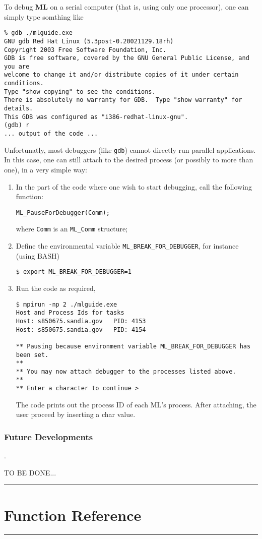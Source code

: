 \documentclass[10pt,letter,relax]{SANDreport}
\newcommand{\HRule}{\noindent\rule{\linewidth}{1mm}}
\newcommand{\ML}     {{\bf ML }}
\begin{document}
To debug \ML on a serial computer (that is, using only one processor),
one can simply type somthing like
\begin{verbatim}
% gdb ./mlguide.exe
GNU gdb Red Hat Linux (5.3post-0.20021129.18rh)
Copyright 2003 Free Software Foundation, Inc.
GDB is free software, covered by the GNU General Public License, and you are
welcome to change it and/or distribute copies of it under certain conditions.
Type "show copying" to see the conditions.
There is absolutely no warranty for GDB.  Type "show warranty" for details.
This GDB was configured as "i386-redhat-linux-gnu".
(gdb) r
... output of the code ...
\end{verbatim}
Unfortunatly, most debuggers (like \verb!gdb!) cannot directly run
parallel applications. In this case, one can still attach to the desired
process (or possibly to more than one), in a very simple way:
\begin{enumerate}
\item In the part of the code where one wish to start debugging, call
  the following function:
\begin{verbatim}
ML_PauseForDebugger(Comm);
\end{verbatim}
where \verb!Comm! is an \verb!ML_Comm! structure;
\item Define the environmental variable \verb!ML_BREAK_FOR_DEBUGGER!,
  for instance (using BASH)
\begin{verbatim}
$ export ML_BREAK_FOR_DEBUGGER=1
\end{verbatim}
\item Run the code as required,
\begin{verbatim}
$ mpirun -np 2 ./mlguide.exe
Host and Process Ids for tasks
Host: s850675.sandia.gov   PID: 4153
Host: s850675.sandia.gov   PID: 4154

** Pausing because environment variable ML_BREAK_FOR_DEBUGGER has been set.
**
** You may now attach debugger to the processes listed above.
**
** Enter a character to continue >
\end{verbatim}
The code prints out the process ID of each ML's process. After
attaching, the user proceed by inserting a char value.
\end{enumerate}


\section{Future Developments}
\label{sec:to-do}.

TO BE DONE...


\clearpage
\newpage

\vspace*{3cm}
\HRule
\part{Function Reference}
\HRule
\clearpage
\newpage




\end{document}
